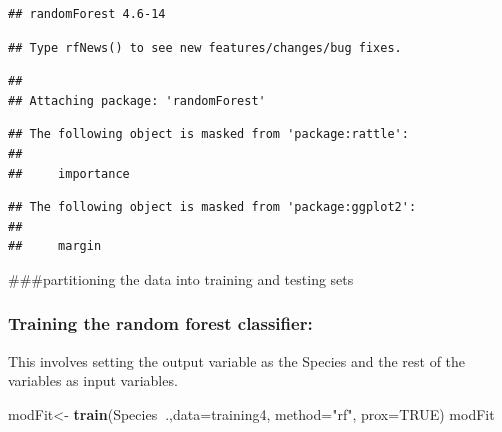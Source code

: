 \documentclass[
]{article}
\newenvironment{Shaded}{\begin{snugshade}}{\end{snugshade}}
\newcommand{\DataTypeTok}[1]{\textcolor[rgb]{0.13,0.29,0.53}{#1}}
\newcommand{\FloatTok}[1]{\textcolor[rgb]{0.00,0.00,0.81}{#1}}
\newcommand{\KeywordTok}[1]{\textcolor[rgb]{0.13,0.29,0.53}{\textbf{#1}}}
\newcommand{\NormalTok}[1]{#1}
\newcommand{\OperatorTok}[1]{\textcolor[rgb]{0.81,0.36,0.00}{\textbf{#1}}}
\newcommand{\OtherTok}[1]{\textcolor[rgb]{0.56,0.35,0.01}{#1}}
\newcommand{\StringTok}[1]{\textcolor[rgb]{0.31,0.60,0.02}{#1}}
\begin{document}
\begin{verbatim}
## randomForest 4.6-14
\end{verbatim}

\begin{verbatim}
## Type rfNews() to see new features/changes/bug fixes.
\end{verbatim}

\begin{verbatim}
## 
## Attaching package: 'randomForest'
\end{verbatim}

\begin{verbatim}
## The following object is masked from 'package:rattle':
## 
##     importance
\end{verbatim}

\begin{verbatim}
## The following object is masked from 'package:ggplot2':
## 
##     margin
\end{verbatim}

\#\#\#partitioning the data into training and testing sets

\begin{Shaded}
\end{Shaded}

\hypertarget{training-the-random-forest-classifier}{%
\subsubsection{Training the random forest
classifier:}\label{training-the-random-forest-classifier}}

This involves setting the output variable as the Species and the rest of
the variables as input variables.

\begin{Shaded}
\begin{Highlighting}[]
\NormalTok{modFit<-}\StringTok{ }\KeywordTok{train}\NormalTok{(Species}\OperatorTok{~}\NormalTok{.,}\DataTypeTok{data=}\NormalTok{training4, }\DataTypeTok{method=}\StringTok{"rf"}\NormalTok{, }\DataTypeTok{prox=}\OtherTok{TRUE}\NormalTok{)}
\NormalTok{modFit}
\end{Highlighting}
\end{Shaded}
\end{document}
